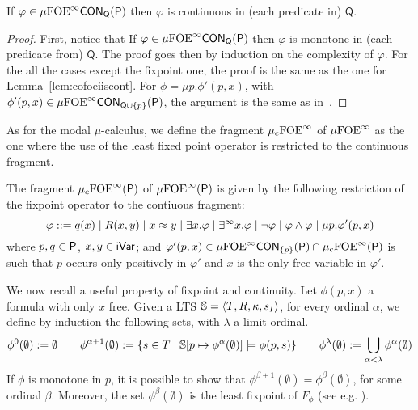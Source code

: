 \begin{lemma}\label{lem:colqueiscont_mu}
If $\varphi \in \mu{\ensuremath{\mathrm{FOE}}}^\infty\mathsf{CON}_{\mathsf{Q}}(\mathsf{P})$ then $\varphi$ is continuous in (each predicate in) $\mathsf{Q}$.
\end{lemma}
%
\begin{proof} First, notice that If $\varphi \in \mu{\ensuremath{\mathrm{FOE}}}^\infty\mathsf{CON}_{\mathsf{Q}}(\mathsf{P})$ then $\varphi$ is monotone  in (each predicate from) $\mathsf{Q}$. %
The proof goes then by induction on the complexity of $\varphi$. For the all the cases except the fixpoint one, the proof is the same as the one for Lemma~\ref{lem:cofoeiiscont}. For $\phi=\mu p. \phi'(p, x)$, with $\phi'(p,x) \in \mu{\ensuremath{\mathrm{FOE}}}^\infty\mathsf{CON}_{\mathsf{Q} \cup\{p\}}(\mathsf{P})$, the argument is the same as in~\cite[Lemma 1]{Fontaine08}.
\end{proof}

As for the modal $\mu$-calculus, we define the fragment $\mu_{c}{\mathrm{FOE}}^\infty$ of $\mu{\ensuremath{\mathrm{FOE}}}^\infty$ as the one where the use of the least fixed point operator is restricted to the continuous fragment. %

\begin{definition}
The fragment $\mu_{c}{\mathrm{FOE}}^\infty(\mathsf{P})$ of $\mu{\ensuremath{\mathrm{FOE}}}^\infty(\mathsf{P})$ is given by the following restriction of the fixpoint operator to the contiuous fragment:
{\small%
$$
\varphi ::= q(x) \mid R(x,y) \mid x \approx y \mid \exists x.\varphi \mid \exists^\infty x.\varphi \mid \lnot\varphi \mid \varphi \land \varphi \mid \mu p.\varphi'(p,x)
$$}%
where $p,q\in\mathsf{P}$, $x,y\in\mathsf{iVar}$; and $\varphi'(p,x) \in \mu{\ensuremath{\mathrm{FOE}}}^\infty\mathsf{CON}_{\{p\}}(\mathsf{P}) \cap \mu_{c}{\mathrm{FOE}}^\infty(\mathsf{P})$ is such that $p$ occurs only positively in $\varphi'$ and $x$ is the only free variable in $\varphi'$.
\end{definition}

We now recall a useful property of fixpoint and continuity. Let $\phi(p,x)$ a formula with only $x$ free.
Given a LTS $\mathbb{S} = \langle{T,R,\kappa,s_I}\rangle$, for every ordinal $\alpha$, we define by induction the following sets, with $\lambda$ a limit ordinal.
\begin{equation*}
\phi^0(\emptyset):= \emptyset \qquad \phi^{\alpha+1}(\emptyset):= \{ s \in T \mid \mathbb{S}[p \mapsto \phi^\alpha(\emptyset)] \models \phi(p, s)\} \qquad \phi^{\lambda}(\emptyset):= \bigcup_{\alpha < \lambda} \phi^{\alpha}(\emptyset)
\end{equation*}
If $\phi$ is monotone in $p$, it is possible to show that $\phi^{\beta+1}(\emptyset)= \phi^{\beta}(\emptyset)$, for some ordinal $\beta$. Moreover, the set $\phi^{\beta}(\emptyset)$ is the least fixpoint of $F_\phi$ (see e.g. \cite{ArnoldN01}).



